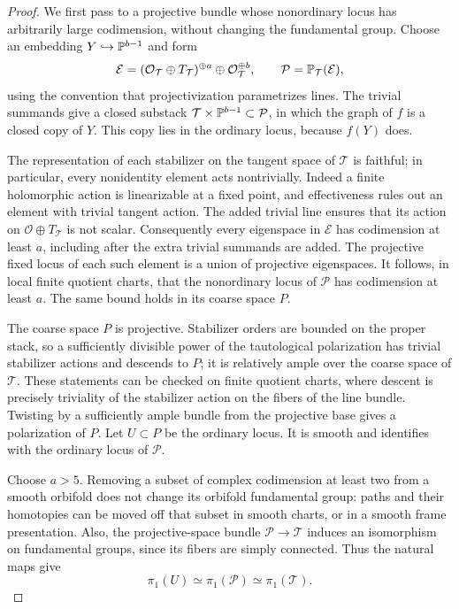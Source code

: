 \begin{proof}
We first pass to a projective bundle whose nonordinary locus has
arbitrarily large codimension, without changing the fundamental group.
Choose an embedding $Y\hookrightarrow\mathbb P^{b-1}$ and form
\[
 \mathcal E=(\mathcal O_{\mathcal T}\oplus T_{\mathcal T})^{\oplus a}
                 \oplus\mathcal O_{\mathcal T}^{\oplus b},
 \qquad \mathcal P=\mathbb P_{\mathcal T}(\mathcal E),
\]
using the convention that projectivization parametrizes lines.  The
trivial summands give a closed substack
$\mathcal T\times\mathbb P^{b-1}\subset\mathcal P$, in which the graph of
$f$ is a closed copy of $Y$.  This copy lies in the ordinary locus,
because $f(Y)$ does.

The representation of each stabilizer on the tangent space of
$\mathcal T$ is faithful; in particular, every nonidentity element acts
nontrivially.  Indeed a finite holomorphic action is linearizable at a
fixed point, and effectiveness rules out an element with trivial tangent
action.  The added trivial line ensures
that its action on $\mathcal O\oplus T_{\mathcal T}$ is not scalar.
Consequently every eigenspace in $\mathcal E$ has codimension at least
$a$, including after the extra trivial summands are added.  The
projective fixed locus of each such element is a union of projective
eigenspaces.  It follows, in local finite quotient charts, that the
nonordinary locus of $\mathcal P$ has codimension at least $a$.
The same bound holds in its coarse space $P$.

The coarse space $P$ is projective.  Stabilizer orders are bounded on
the proper stack, so a sufficiently divisible power of the tautological
polarization has trivial stabilizer actions and
descends to $P$; it is relatively ample over the coarse space of
$\mathcal T$.  These statements can be checked on finite quotient
charts, where descent is precisely triviality of the stabilizer action
on the fibers of the line bundle.  Twisting by a sufficiently ample
bundle from the projective base gives a polarization of $P$.
Let $U\subset P$ be the ordinary locus.  It is smooth and identifies
with the ordinary locus of $\mathcal P$.

Choose $a>5$.  Removing a subset of complex codimension at least two
from a smooth orbifold does not change its orbifold fundamental group:
paths and their homotopies can be moved off that subset in smooth
charts, or in a smooth frame presentation.  Also, the projective-space
bundle $\mathcal P\to\mathcal T$ induces an isomorphism on fundamental
groups, since its fibers are simply connected.  Thus the natural maps
give
\begin{equation}\label{proj:ordinary-group}
 \pi_1(U)\simeq\pi_1(\mathcal P)\simeq\pi_1(\mathcal T).
\end{equation}


\end{proof}
